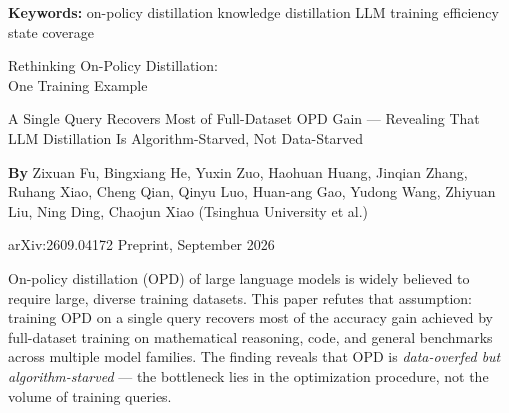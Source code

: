 \documentclass[10pt,twocolumn]{article}
\begin{document}
\setlength{\parindent}{0pt}
\setlength{\parskip}{4pt}

{\small\color{keywordgray}\textbf{Keywords:}
  on-policy distillation \textbullet{}
  knowledge distillation \textbullet{}
  LLM training efficiency \textbullet{}
  state coverage}\par\vspace{4pt}

{\LARGE\bfseries\raggedright
  Rethinking On-Policy Distillation:\\
  One Training Example}\par\vspace{4pt}

{\large\itshape\raggedright
  A Single Query Recovers Most of Full-Dataset
  OPD Gain --- Revealing That LLM Distillation
  Is Algorithm-Starved, Not Data-Starved}\par\vspace{6pt}

{\small\textbf{By} Zixuan Fu, Bingxiang He, Yuxin Zuo, Haohuan Huang,
  Jinqian Zhang, Ruhang Xiao, Cheng Qian, Qinyu Luo, Huan-ang Gao,
  Yudong Wang, Zhiyuan Liu, Ning Ding, Chaojun Xiao
  (Tsinghua University et al.)}\par\vspace{2pt}

{\small\color{keywordgray}arXiv:2609.04172 \textbullet{} Preprint, September 2026}
\par\vspace{2pt}\noindent{\color{rulered}\rule{\columnwidth}{0.6pt}}\vspace{6pt}

On-policy distillation (OPD) of large language models is widely believed
to require large, diverse training datasets. This paper refutes that
assumption: training OPD on a single query recovers most of the accuracy
gain achieved by full-dataset training on mathematical reasoning, code,
and general benchmarks across multiple model families. The finding reveals
that OPD is \emph{data-overfed but algorithm-starved} --- the bottleneck
lies in the optimization procedure, not the volume of training queries.
\end{document}
